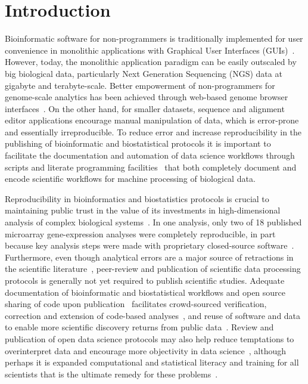 \documentclass{frontiersSCNS} %
\begin{document}
\section{Introduction}

Bioinformatic software for non-programmers is traditionally
implemented for user convenience in monolithic applications with
Graphical User Interfaces (GUIs)~\citep{Smith1994, Rampp2006,
  Librado01062009,gouy2010seaview}.  However, today, the monolithic
application paradigm can be easily outscaled by big biological data,
particularly Next Generation Sequencing (NGS) data at gigabyte and
terabyte-scale.  Better empowerment of non-programmers for
genome-scale analytics has been achieved through web-based genome
browser
interfaces~\citep{Cunningham28012015,Rosenbloom28012015,Markowitz01012014}. On
the other hand, for smaller datasets, sequence and alignment editor
applications encourage manual manipulation of data, which is
error-prone and essentially irreproducible. To reduce error and
increase reproducibility in the publishing of bioinformatic and
biostatistical protocols it is important to facilitate the
documentation and automation of data science workflows through scripts
and literate programming facilities~\citep{knuth1984literate} that
both completely document and encode scientific workflows for machine
processing of biological data.

Reproducibility in bioinformatics and biostatistics protocols is
crucial to maintaining public trust in the value of its investments in
high-dimensional analysis of complex biological
systems~\citep{BaggerlyCoombes2009,hutson2010data,Baggerly01052011,Huang01072013}.
In one analysis, only two of 18 published microarray gene-expression
analyses were completely reproducible, in part because key analysis
steps were made with proprietary closed-source
software~\citep{Ioannidis:2008cr}. Furthermore, even though analytical
errors are a major source of retractions in the scientific
literature~\citep{Casadevall01092014}, peer-review and publication of
scientific data processing protocols is generally not yet required to
publish scientific studies.  Adequate documentation of bioinformatic
and biostatistical workflows and open source sharing of code upon
publication~\citep{Peng01072009} facilitates crowd-sourced
verification, correction and extension of code-based
analyses~\citep{barnes2010publish,Morin13042012}, and reuse of
software and data to enable more scientific discovery returns from
public data~\citep{Peng02122011}. Review and publication of open data
science protocols may also help reduce temptations to overinterpret
data and encourage more objectivity in data
science~\citep{Boulesteix01022010}, although perhaps it is expanded
computational and statistical literacy and training for all scientists
that is the ultimate remedy for these
problems~\citep{Morin13042012,Joppa17052013}.
\end{document}

